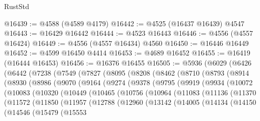 \begin{lexlean}{RustStd}
\begin{coremodule}
{\begin{coremodule}
{{{{{{{{{{{{{{{{{{{{{{{{{{{{{{{{{{{{{{{{{{{{{{{{{{{{{{{@16439 := @4588 (@4589 @4179)
@16442 := @4525 (@16437 @16439) @4547
@16443 := @16429 @16442
@16444 := @4523 @16443
@16446 := @4556 (@4557 @16424)
@16449 := @4556 (@4557 @16434) @4560
@16450 := @16446 @16449
@16452 := @4599 @16450 @4414
@16453 := @4689 @16452
@16455 := @16419 (@16444 @16453)
@16456 := @16376 @16455
@16505 := @5936
    (@6029
      (@6426
        (@6442
          (@7238
            (@7549
              (@7827
                (@8095
                  (@8208
                    (@8462
                      (@8710
                        (@8793
                          (@8914
                            (@8930
                              (@8986
                                (@9070
                                  (@9164
                                    (@9274
                                      (@9378
                                        (@9795
                                          (@9919
                                            (@9934
                                              (@10072
                                                (@10083
                                                  (@10320
                                                    (@10449
                                                      (@10465
                                                        (@10756
                                                          (@10964
                                                            (@11083
                                                              (@11136
                                                                (@11370
                                                                  (@11572
                                                                    (@11850
                                                                      (@11957
                                                                        (@12788
                                                                          (@12960
                                                                            (@13142
                                                                              (@14005
                                                                                (@14134
                                                                                  (@14150
                                                                                    (@14546
                                                                                      (@15479
                                                                                        (@15553
}}}}}}}}}}}}}}}}}}}}}}}}}}}}}}}}}}}}}}}}}}}}}}}}}}}}}}}
\end{coremodule}}
\end{coremodule}
\end{lexlean}
